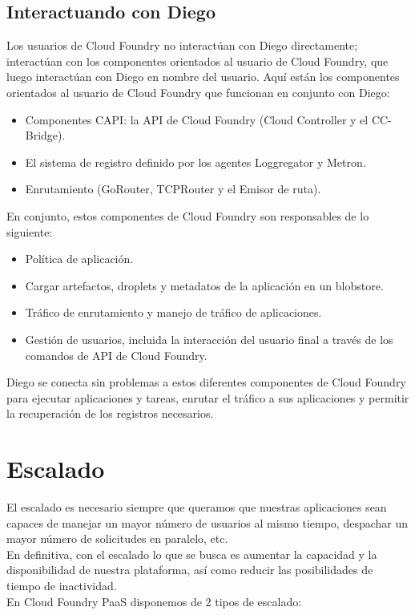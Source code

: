 \documentclass[a4paper,11pt]{article}
\begin{document}
\subsection{Interactuando con Diego}
Los usuarios de Cloud Foundry no interactúan con Diego directamente; interactúan con los componentes orientados al usuario de Cloud Foundry, que luego interactúan con Diego en nombre del usuario. Aquí están los componentes orientados al usuario de Cloud Foundry que funcionan en conjunto con Diego:
\begin{itemize}
  \item  Componentes CAPI: la API de Cloud Foundry (Cloud Controller y el CC-Bridge).
\item  El sistema de registro definido por los agentes Loggregator y Metron.
\item  Enrutamiento (GoRouter, TCPRouter y el Emisor de ruta).
\end{itemize}
En conjunto, estos componentes de Cloud Foundry son responsables de lo siguiente:
\begin{itemize}
  \item Política de aplicación.
\item  Cargar artefactos, droplets y metadatos de la aplicación en un blobstore.
\item  Tráfico de enrutamiento y manejo de tráfico de aplicaciones.
\item  Gestión de usuarios, incluida la interacción del usuario final a través de los comandos
de API de Cloud Foundry.
\end{itemize}
Diego se conecta sin problemas a estos diferentes componentes de Cloud Foundry para ejecutar aplicaciones y tareas, enrutar el tráfico a sus aplicaciones y permitir la recuperación de los registros necesarios.






\section{Escalado}
El escalado es necesario siempre que queramos que nuestras aplicaciones sean capaces de manejar un mayor número de usuarios al mismo tiempo, despachar un mayor número de solicitudes en paralelo, etc.\\
En definitiva, con el escalado lo que se busca es aumentar la capacidad y la disponibilidad de nuestra plataforma, así como reducir las posibilidades de tiempo de inactividad.\\
En Cloud Foundry PaaS disponemos de 2 tipos de escalado:
\end{document}
